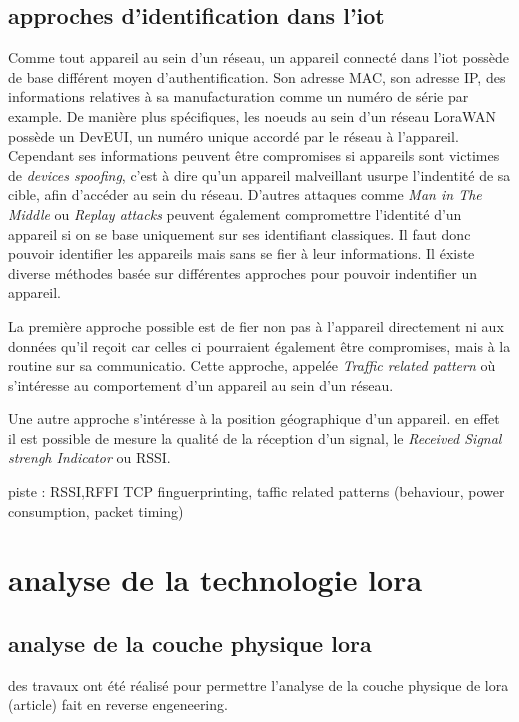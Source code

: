 \subsection{approches d'identification dans l'iot}

Comme tout appareil au sein d'un réseau, un appareil connecté dans l'iot possède de base différent moyen d'authentification. Son adresse MAC, son adresse IP, des informations relatives à sa manufacturation comme un numéro de série par example. De manière plus spécifiques, les noeuds au sein d'un réseau LoraWAN possède un DevEUI, un numéro unique accordé par le réseau à l'appareil. Cependant ses informations peuvent être compromises si appareils sont victimes de \textit{devices spoofing}, c'est à dire qu'un appareil malveillant usurpe l'indentité de sa cible, afin d'accéder au sein du réseau. D'autres attaques comme \textit{Man in The Middle} ou \textit{Replay attacks} peuvent également compromettre l'identité d'un appareil si on se base uniquement sur ses identifiant classiques. Il faut donc pouvoir identifier les appareils mais sans se fier à leur informations. Il éxiste diverse méthodes basée sur différentes approches pour pouvoir indentifier un appareil. 

La première approche possible est de fier non pas à l'appareil directement ni aux données qu'il reçoit car celles ci pourraient également être compromises, mais à la routine sur sa communicatio. Cette approche, appelée \textit{Traffic related pattern} où s'intéresse au comportement d'un appareil au sein d'un réseau. 

Une autre approche s'intéresse à la position géographique d'un appareil. en effet il est possible de mesure la qualité de la réception d'un signal, le \textit{Received Signal strengh Indicator} ou RSSI.

piste : RSSI,RFFI TCP finguerprinting, taffic related patterns (behaviour, power consumption, packet timing) 

\section{analyse de la technologie lora}

\subsection{analyse de la couche physique lora}

des travaux ont été réalisé pour permettre l'analyse de la couche physique de lora (article)
fait en reverse engeneering. 

